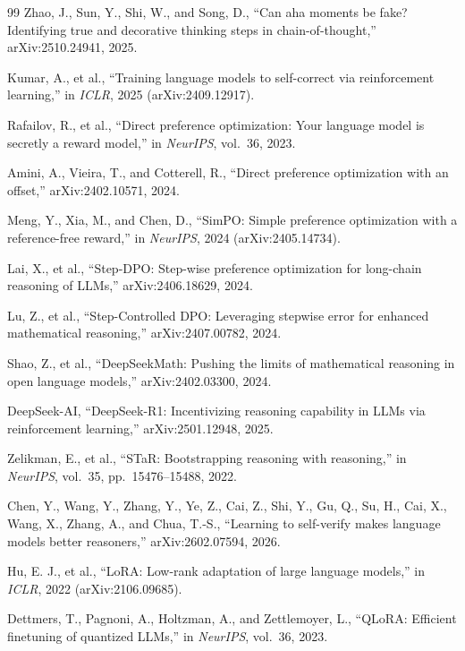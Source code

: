 \documentclass[11pt, a4paper]{article}
\begin{document}
{\begin{thebibliography}{99}
Zhao, J., Sun, Y., Shi, W., and Song, D., ``Can aha moments be fake? Identifying true and decorative thinking steps in chain-of-thought,'' arXiv:2510.24941, 2025.

Kumar, A., et al., ``Training language models to self-correct via reinforcement learning,'' in \textit{ICLR}, 2025 (arXiv:2409.12917).

Rafailov, R., et al., ``Direct preference optimization: Your language model is secretly a reward model,'' in \textit{NeurIPS}, vol.~36, 2023.

Amini, A., Vieira, T., and Cotterell, R., ``Direct preference optimization with an offset,'' arXiv:2402.10571, 2024.

Meng, Y., Xia, M., and Chen, D., ``SimPO: Simple preference optimization with a reference-free reward,'' in \textit{NeurIPS}, 2024 (arXiv:2405.14734).

Lai, X., et al., ``Step-DPO: Step-wise preference optimization for long-chain reasoning of LLMs,'' arXiv:2406.18629, 2024.

Lu, Z., et al., ``Step-Controlled DPO: Leveraging stepwise error for enhanced mathematical reasoning,'' arXiv:2407.00782, 2024.

Shao, Z., et al., ``DeepSeekMath: Pushing the limits of mathematical reasoning in open language models,'' arXiv:2402.03300, 2024.

DeepSeek-AI, ``DeepSeek-R1: Incentivizing reasoning capability in LLMs via reinforcement learning,'' arXiv:2501.12948, 2025.

Zelikman, E., et al., ``STaR: Bootstrapping reasoning with reasoning,'' in \textit{NeurIPS}, vol.~35, pp.~15476--15488, 2022.

Chen, Y., Wang, Y., Zhang, Y., Ye, Z., Cai, Z., Shi, Y., Gu, Q., Su, H., Cai, X., Wang, X., Zhang, A., and Chua, T.-S., ``Learning to self-verify makes language models better reasoners,'' arXiv:2602.07594, 2026.

Hu, E. J., et al., ``LoRA: Low-rank adaptation of large language models,'' in \textit{ICLR}, 2022 (arXiv:2106.09685).

Dettmers, T., Pagnoni, A., Holtzman, A., and Zettlemoyer, L., ``QLoRA: Efficient finetuning of quantized LLMs,'' in \textit{NeurIPS}, vol.~36, 2023.


\end{thebibliography}}
\end{document}
